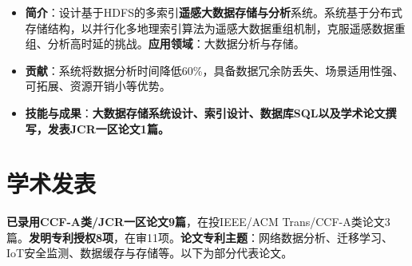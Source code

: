 \documentclass[UTF8,letterpaper,11pt]{article}
\begin{document}
\begin{itemize}
  \setlength\itemsep{2.0pt}
  \item \textbf{简介}：设计基于HDFS的多索引\textbf{遥感大数据存储与分析}系统。系统基于分布式存储结构，以并行化多地理索引算法为遥感大数据重组机制，克服遥感数据重组、分析高时延的挑战。\textbf{应用领域}：大数据分析与存储。
  \item \textbf{贡献}：系统将数据分析时间降低60\%，具备数据冗余防丢失、场景适用性强、可拓展、资源开销小等优势。
  \item \textbf{技能与成果}：\textbf{大数据存储系统设计、索引设计、数据库SQL以及学术论文撰写，发表JCR一区论文1篇。}
\end{itemize}




\section{\textbf{学术发表}}

\textbf{已录用CCF-A类/JCR一区论文9篇}，在投IEEE/ACM Trans/CCF-A类论文3篇。\textbf{发明专利授权8项}，在审11项。\textbf{论文专利主题}：网络数据分析、迁移学习、IoT安全监测、数据缓存与存储等。以下为部分代表论文。
\end{document}
